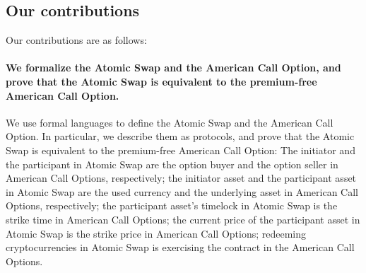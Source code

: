 \subsection{Our contributions}


Our contributions are as follows:

\paragraph{We formalize the Atomic Swap and the American Call Option, and prove that the Atomic Swap is equivalent to the premium-free American Call Option.}
We use formal languages to define the Atomic Swap and the American Call Option.
In particular, we describe them as protocols, and prove that the Atomic Swap is equivalent to the premium-free American Call Option:
The initiator and the participant in Atomic Swap are the option buyer and the option seller in American Call Options, respectively;
the initiator asset and the participant asset in Atomic Swap are the used currency and the underlying asset in American Call Options, respectively;
the participant asset's timelock in Atomic Swap is the strike time in American Call Options;
the current price of the participant asset in Atomic Swap is the strike price in American Call Options;
redeeming cryptocurrencies in Atomic Swap is exercising the contract in the American Call Options.

